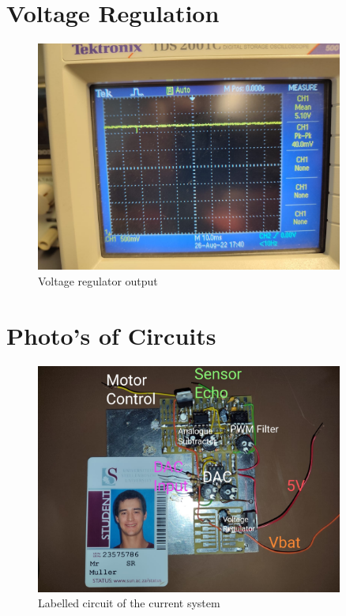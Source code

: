\clearpage
\section{Voltage Regulation}
\begin{figure}[H]
\centering
\includegraphics[width = 0.9\textwidth]{./Figures/Volt_Reg_Noise.jpeg}
\caption{Voltage regulator output}
\label{fig:volt_reg_noise}
\end{figure}

\clearpage
\section{Photo's of Circuits}
\begin{figure}[H]
\centering
\includegraphics[width = 0.9\textwidth]{./Figures/FullCircuit.jpeg}
\caption{Labelled circuit of the current system}
\label{fig:full_prac_cir}
\end{figure}

